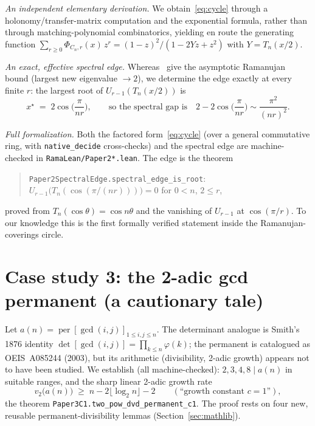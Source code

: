 \documentclass[11pt]{article}
\theoremstyle{remark}\newtheorem{remark}[theorem]{Remark}
\DeclareMathOperator{\perm}{per}
\newcommand{\vtwo}{v_2}
\begin{document}
\emph{An independent elementary derivation.} We obtain~\eqref{eq:cycle} through a
holonomy/transfer-matrix computation and the exponential formula, rather than
through matching-polynomial combinatorics, yielding en route the generating
function $\sum_{r\ge0}\Phi_{C_n,r}(x)\,z^r = (1-z)^2/(1-2Yz+z^2)$ with
$Y=T_n(x/2)$.

\emph{An exact, effective spectral edge.} Whereas~\cite{HPS} give the asymptotic
Ramanujan bound (largest new eigenvalue $\to 2$), we determine the edge exactly at
every finite $r$: the largest root of $U_{r-1}(T_n(x/2))$ is
\[
   x^\star \;=\; 2\cos\!\Big(\frac{\pi}{nr}\Big),
   \qquad\text{so the spectral gap is}\quad
   2 - 2\cos\!\Big(\frac{\pi}{nr}\Big) \sim \frac{\pi^2}{(nr)^2}.
\]

\emph{Full formalization.} Both the factored form~\eqref{eq:cycle} (over a general
commutative ring, with \texttt{native\_decide} cross-checks) and the spectral edge
are machine-checked in \texttt{RamaLean/Paper2*.lean}. The edge is the theorem
\begin{quote}
\texttt{Paper2SpectralEdge.spectral\_edge\_is\_root}:\quad
$U_{r-1}\big(T_n(\cos(\pi/(nr)))\big)=0$ \; for $0<n$, $2\le r$,
\end{quote}
proved from $T_n(\cos\theta)=\cos n\theta$ and the vanishing of $U_{r-1}$ at
$\cos(\pi/r)$. To our knowledge this is the first formally verified statement
inside the Ramanujan-coverings circle.

\section{Case study 3: the 2-adic gcd permanent (a cautionary tale)}\label{sec:gcd}

Let $a(n)=\perm[\gcd(i,j)]_{1\le i,j\le n}$. The determinant analogue is Smith's
1876 identity $\det[\gcd(i,j)]=\prod_{k\le n}\varphi(k)$; the permanent is catalogued
as OEIS~A085244 (2003), but its arithmetic (divisibility, 2-adic growth) appears not
to have been studied. We establish (all machine-checked): $2,3,4,8\mid a(n)$ in
suitable ranges, and the sharp linear 2-adic growth rate
\begin{equation}\label{eq:c1}
   \vtwo\big(a(n)\big) \;\ge\; n - 2\lfloor\log_2 n\rfloor - 2
   \qquad(\text{``growth constant } c=1\text{''}),
\end{equation}
the theorem \texttt{Paper3C1.two\_pow\_dvd\_permanent\_c1}. The proof rests on four
new, reusable permanent-divisibility lemmas (Section~\ref{sec:mathlib}).
\end{document}
